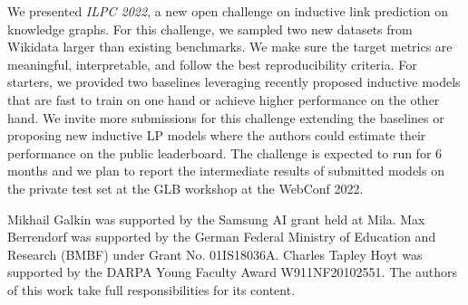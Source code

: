 \documentclass[sigconf,screen]{acmart}
\newcommand{\ilpc}{\textsl{\textsc{ILPC 2022}}\xspace}
\begin{document}
We presented \ilpc, a new open challenge on inductive link prediction on knowledge graphs. For this challenge, we sampled two new datasets from Wikidata larger than existing benchmarks. 
We make sure the target metrics are meaningful, interpretable, and follow the best reproducibility criteria.
For starters, we provided two baselines leveraging recently proposed inductive models that are fast to train on one hand or achieve higher performance on the other hand. 
We invite more submissions for this challenge extending the baselines or proposing new inductive LP models where the authors could estimate their performance on the public leaderboard. 
The challenge is expected to run for 6 months and we plan to report the intermediate results of submitted models on the private test set at the GLB workshop at the WebConf 2022.

\begin{acks}

Mikhail Galkin was supported by the Samsung AI grant held at Mila.
Max Berrendorf was supported by the German Federal Ministry of Education and Research (BMBF) under Grant No. 01IS18036A.
Charles Tapley Hoyt was supported by the DARPA Young Faculty Award W911NF20102551.
The authors of this work take full responsibilities for its content.

\end{acks}



\end{document}
